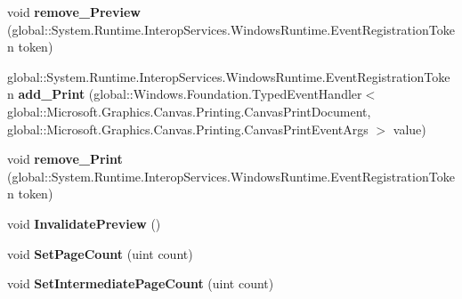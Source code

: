 \begin{DoxyCompactItemize}
\item 
\mbox{\label{class_microsoft_1_1_graphics_1_1_canvas_1_1_printing_1_1_canvas_print_document_aa7beedc13a3a13307163655bbab18019}} 
void {\bfseries remove\+\_\+\+Preview} (global\+::\+System.\+Runtime.\+Interop\+Services.\+Windows\+Runtime.\+Event\+Registration\+Token token)
\item 
\mbox{\label{class_microsoft_1_1_graphics_1_1_canvas_1_1_printing_1_1_canvas_print_document_a9da3eaf71e29837bb52c49b799a88293}} 
global\+::\+System.\+Runtime.\+Interop\+Services.\+Windows\+Runtime.\+Event\+Registration\+Token {\bfseries add\+\_\+\+Print} (global\+::\+Windows.\+Foundation.\+Typed\+Event\+Handler$<$ global\+::\+Microsoft.\+Graphics.\+Canvas.\+Printing.\+Canvas\+Print\+Document, global\+::\+Microsoft.\+Graphics.\+Canvas.\+Printing.\+Canvas\+Print\+Event\+Args $>$ value)
\item 
\mbox{\label{class_microsoft_1_1_graphics_1_1_canvas_1_1_printing_1_1_canvas_print_document_a247a72beac098c3ac4e60deec5108fb3}} 
void {\bfseries remove\+\_\+\+Print} (global\+::\+System.\+Runtime.\+Interop\+Services.\+Windows\+Runtime.\+Event\+Registration\+Token token)
\item 
\mbox{\label{class_microsoft_1_1_graphics_1_1_canvas_1_1_printing_1_1_canvas_print_document_a8bbb671d9de2e348757da7e7d7c1935c}} 
void {\bfseries Invalidate\+Preview} ()
\item 
\mbox{\label{class_microsoft_1_1_graphics_1_1_canvas_1_1_printing_1_1_canvas_print_document_af703c668de7e2905cf76a064da8dbd29}} 
void {\bfseries Set\+Page\+Count} (uint count)
\item 
\mbox{\label{class_microsoft_1_1_graphics_1_1_canvas_1_1_printing_1_1_canvas_print_document_a570bac56fc10f4180d8e4371d1c2b1ec}} 
void {\bfseries Set\+Intermediate\+Page\+Count} (uint count)

\end{DoxyCompactItemize}
